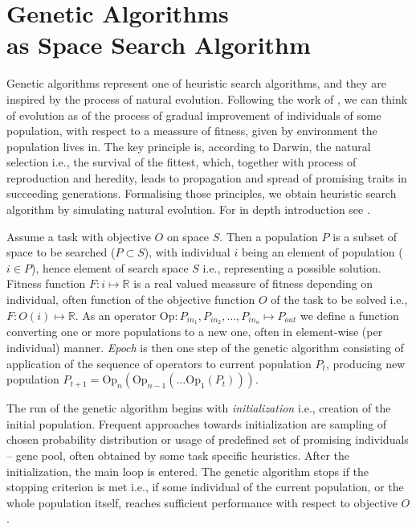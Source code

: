 \section[Genetic Algorithms as Space Search Algorithm]{Genetic Algorithms \\ as Space Search Algorithm}
\label{sec:ga_theory}
Genetic algorithms represent one of heuristic search algorithms, and they are inspired by the process of natural evolution. Following the work of \cite{darwin1859}, we can think of evolution as of the process of gradual improvement of individuals of some population, with respect to a meassure of fitness, given by environment the population lives in. The key principle is, according to Darwin, the natural selection i.e., the survival of the fittest, which, together with process of reproduction and heredity, leads to propagation and spread of promising traits in succeeding generations. Formalising those principles, we obtain heuristic search algorithm by simulating natural evolution. For in depth introduction see \cite{evolution}.

Assume a task with objective $O$ on space $S$. Then a population $P$ is a subset of space to be searched ($P \subset S$), with individual $i$ being an element of population ($i \in P$), hence element of search space $S$ i.e., representing a possible solution. Fitness function $F: i \mapsto \mathbb{R}$ is a real valued meassure of fitness depending on individual, often function of the objective function $O$ of the task to be solved i.e., $F: O(i) \mapsto \mathbb{R}$. As an operator $\text{Op}: P_{in_1}, P_{in_2}, \dots, P_{in_n} \mapsto P_{out}$ we define a function converting one or more populations to a new one, often in element-wise (per individual) manner. \emph{Epoch} is then one step of the genetic algorithm consisting of application of the sequence of operators to current population $P_t$, producing new population $P_{t+1} = \text{Op}_n\left(\text{Op}_{n-1}\left(\dots \text{Op}_1(P_t)\right)\right)$.

The run of the genetic algorithm begins with \emph{initialization} i.e., creation of the initial population. Frequent approaches towards initialization are sampling of chosen probability distribution or usage of predefined set of promising individuals -- gene pool, often obtained by some task specific heuristics. After the initialization, the main loop is entered. The genetic algorithm stops if the stopping criterion is met i.e., if some individual of the current population, or the whole population itself, reaches sufficient performance with respect to objective $O$.

